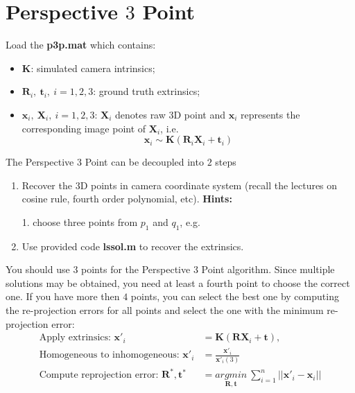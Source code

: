 \documentclass[a4paper]{article}
\begin{document}
\section{Perspective $3$ Point}
Load the \textbf{p3p.mat} which contains:
\begin{itemize}
\item $\mathbf{K}$: simulated camera intrinsics;
\item $\mathbf{R}_i,\ \mathbf{t}_i,\ i=1,2,3$: ground truth extrinsics;
\item $\mathbf{x}_i,\ \mathbf{X}_i,\ i=1,2,3$: $\mathbf{X}_i$ denotes raw $3$D point and $\mathbf{x}_i$ represents the corresponding image point of $\mathbf{X}_i$, i.e. $$\mathbf{x}_i \sim \mathbf{K}(\mathbf{R}_i\mathbf{X}_i+\mathbf{t}_i)$$
\end{itemize}
The Perspective $3$ Point can be decoupled into $2$ steps
\begin{enumerate}
\item Recover the $3$D points in camera coordinate system (recall the lectures on cosine rule, fourth order polynomial, etc). \textbf{Hints:} 
\begin{itemize}
	1. choose three points from $p_1$ and $q_1$, e.g. 
\end{itemize}


\item Use provided code \textbf{lssol.m} to recover the extrinsics.
\end{enumerate}
You should use $3$ points for the Perspective $3$ Point algorithm. Since multiple solutions may be obtained, you need at least a fourth point to choose the correct one. If you have more then $4$ points, you can select the best one by computing the re-projection errors for all points and select the one with the minimum re-projection error:
\begin{align*}
\text{Apply extrinsics: }\mathbf{x}'_i&=\mathbf{K}(\mathbf{RX}_i+\mathbf{t}),\\
\text{Homogeneous to inhomogeneous: } \mathbf{x}'_i&= \frac{\mathbf{x}'_i}{\mathbf{x}'_i(3)}  \\
\text{Compute reprojection error: }\mathbf{R^*}, \mathbf{t^*}&=\underset{\mathbf{R}, \mathbf{t}}{argmin}\ \sum_{i=1}^{n}||\mathbf{x}'_i-\mathbf{x}_i||\\
\end{align*}
\end{document}
